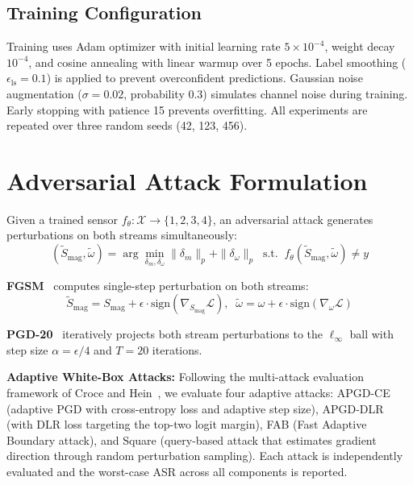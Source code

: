 \documentclass[conference]{IEEEtran}
\begin{document}
\subsection{Training Configuration}

Training uses Adam optimizer with initial learning rate $5 \times 10^{-4}$, weight decay $10^{-4}$, and cosine annealing with linear warmup over 5 epochs. Label smoothing ($\epsilon_{\text{ls}} = 0.1$) is applied to prevent overconfident predictions. Gaussian noise augmentation ($\sigma = 0.02$, probability 0.3) simulates channel noise during training. Early stopping with patience 15 prevents overfitting. All experiments are repeated over three random seeds (42, 123, 456).

\section{Adversarial Attack Formulation}
\label{sec:attacks}

Given a trained sensor $f_\theta: \mathcal{X} \to \{1,2,3,4\}$, an adversarial attack generates perturbations on both streams simultaneously:
\begin{equation}\label{eq:adv}
(\tilde{S}_{\text{mag}}, \tilde{\omega}) = \arg\min_{\delta_m, \delta_\omega} \|\delta_m\|_p + \|\delta_\omega\|_p \;\; \text{s.t.} \;\; f_\theta(\tilde{S}_{\text{mag}}, \tilde{\omega}) \neq y
\end{equation}

\noindent\textbf{FGSM}~\cite{goodfellow2015explaining} computes single-step perturbation on both streams:
\begin{equation}\label{eq:fgsm}
\tilde{S}_{\text{mag}} = S_{\text{mag}} + \epsilon \cdot \text{sign}(\nabla_{S_{\text{mag}}} \mathcal{L}), \;\; \tilde{\omega} = \omega + \epsilon \cdot \text{sign}(\nabla_\omega \mathcal{L})
\end{equation}

\noindent\textbf{PGD-20}~\cite{madry2019towards} iteratively projects both stream perturbations to the $\ell_\infty$ ball with step size $\alpha = \epsilon/4$ and $T = 20$ iterations.

\noindent\textbf{Adaptive White-Box Attacks:} Following the multi-attack evaluation framework of Croce and Hein~\cite{croce2020reliable}, we evaluate four adaptive attacks: APGD-CE (adaptive PGD with cross-entropy loss and adaptive step size), APGD-DLR (with DLR loss targeting the top-two logit margin), FAB (Fast Adaptive Boundary attack), and Square (query-based attack that estimates gradient direction through random perturbation sampling). Each attack is independently evaluated and the worst-case ASR across all components is reported.
\end{document}
